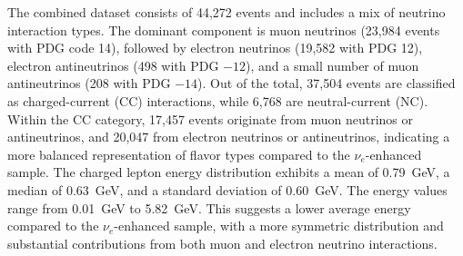 \documentclass{pracalicmgr}
\begin{document}
The combined dataset consists of 44,272 events and includes a mix of neutrino interaction types. The dominant component is muon neutrinos (23,984 events with PDG code 14), followed by electron neutrinos (19,582 with PDG 12), electron antineutrinos (498 with PDG $-12$), and a small number of muon antineutrinos (208 with PDG $-14$). Out of the total, 37,504 events are classified as charged-current (CC) interactions, while 6,768 are neutral-current (NC). Within the CC category, 17,457 events originate from muon neutrinos or antineutrinos, and 20,047 from electron neutrinos or antineutrinos, indicating a more balanced representation of flavor types compared to the $\nu_e$-enhanced sample. The charged lepton energy distribution exhibits a mean of 0.79~GeV, a median of 0.63~GeV, and a standard deviation of 0.60~GeV. The energy values range from 0.01~GeV to 5.82~GeV. This suggests a lower average energy compared to the $\nu_e$-enhanced sample, with a more symmetric distribution and substantial contributions from both muon and electron neutrino interactions.
\end{document}
